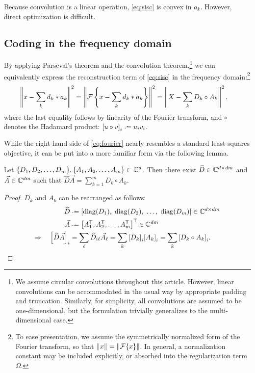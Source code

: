 \documentclass{article} %
\begin{document}
Because convolution is a linear operation, \eqref{eq:sisc} is convex in $a_k$.  
However, direct optimization is difficult.

\subsection{Coding in the frequency domain}
By applying Parseval's theorem and the convolution theorem,\footnote{We assume circular
convolutions throughout this article. However, linear convolutions can be accommodated
in the usual way by appropriate padding and truncation. Similarly, for simplicity, all 
convolutions are assumed to be one-dimensional, but the formulation trivially
generalizes to the multi-dimensional case.} we can equivalently express the 
reconstruction term of \eqref{eq:sisc} in the frequency domain:\footnote{To ease
presentation, we assume the symmetrically normalized form of the Fourier transform, 
so that $\|x\| = \|\mathcal{F}\{x\}\|$. In general, a normalization constant may be included
explicitly, or absorbed into the regularization term $\Omega$.}
\begin{align}
\left\|x - \sum_k d_k * a_k\right\|^2 &= \left\|\mathcal{F}\left\{x - \sum_k d_k *
a_k\right\}\right\|^2
= \left\| X - \sum_k D_k \circ A_k\right\|^2,\label{eq:fourier}
\end{align}
where the last equality follows by linearity of the Fourier transform, and $\circ$
denotes the Hadamard product: ${[u\circ v]}_i \defeq u_i v_i$.

While the right-hand side of \eqref{eq:fourier} nearly resembles a standard
least-squares objective, it can be put into a more familiar form via the following
lemma.
\begin{lemma}
Let $\{D_1, D_2, \dots, D_m\}, \{A_1, A_2, \dots, A_m\} \subset \mathbb{C}^d$.  
Then there exist ${\widehat{D} \in \mathbb{C}^{d\times dm}}$ and ${\vec{A} \in \mathbb{C}^{dm}}$ such that 
${\widehat{D}\vec{A} = \sum_{k=1}^m D_k \circ A_k}$.\label{lemma:hadamard}
\end{lemma}
\begin{proof}
$D_k$ and $A_k$ can be rearranged as follows:
\begin{align*}
\widehat{D} &\defeq \left[\diag(D_1),\; \diag(D_2),\; \dots,\; \diag(D_m)\right] \in \C^{d\times dm}\\
\vec{A} &\defeq \left[A_1\trans, A_2\trans, \dots,
A_m\trans\right]\trans \in \C^{dm}\\
\Rightarrow \quad {\left[\widehat{D}\vec{A}\right]}_i &= \sum_\ell \widehat{D}_{i\ell}
\vec{A}_\ell = \sum_k {[D_k]}_i {[A_k]}_i = \sum_k
{[D_k \circ A_k]}_i.
\end{align*}
\end{proof}
\end{document}
